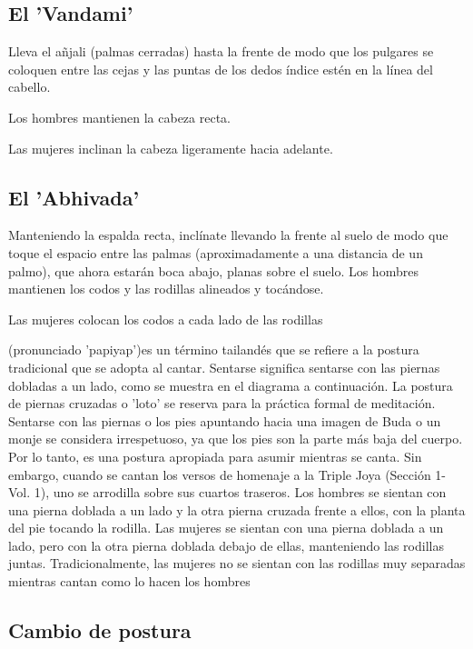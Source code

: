 \subsection{El 'Vandami'}

Lleva el añjali (palmas cerradas) hasta la frente de modo que los pulgares se coloquen entre las cejas y las puntas de los dedos índice estén en la línea del cabello.

Los hombres mantienen la cabeza recta.

Las mujeres inclinan la cabeza ligeramente hacia adelante.

\subsection{El 'Abhivada'}

Manteniendo la espalda recta, inclínate llevando la frente al suelo de modo que toque el espacio entre las palmas (aproximadamente a una distancia de un palmo), que ahora estarán boca abajo, planas sobre el suelo. Los hombres mantienen los codos y las rodillas alineados y tocándose.

Las mujeres colocan los codos a cada lado de las rodillas

\restoreFont{}

 \restoreFont{} (pronunciado 'papiyap')es un término tailandés que se refiere a la postura tradicional que se adopta al cantar. Sentarse  \restoreFont{} significa sentarse con las piernas dobladas a un lado, como se muestra en el diagrama a continuación. La postura de piernas cruzadas o 'loto' se reserva para la práctica formal de meditación. Sentarse con las piernas o los pies apuntando hacia una imagen de Buda o un monje se considera irrespetuoso, ya que los pies son la parte más baja del cuerpo. Por lo tanto,  \restoreFont{} es una postura apropiada para asumir mientras se canta. Sin embargo, cuando se cantan los versos de homenaje a la Triple Joya (Sección 1-Vol. 1), uno se arrodilla sobre sus cuartos traseros. Los hombres se sientan con una pierna doblada a un lado y la otra pierna cruzada frente a ellos, con la planta del pie tocando la rodilla. Las mujeres se sientan con una pierna doblada a un lado, pero con la otra pierna doblada debajo de ellas, manteniendo las rodillas juntas. Tradicionalmente, las mujeres no se sientan con las rodillas muy separadas mientras cantan como lo hacen los hombres

\subsection{Cambio de postura}


